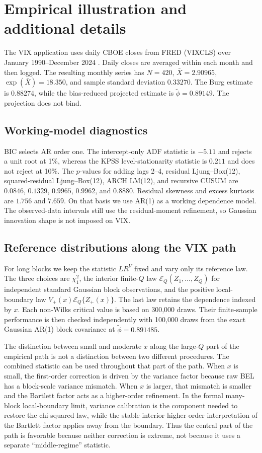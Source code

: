 \documentclass[12pt]{article}
\theoremstyle{remark}
\begin{document}
\section{Empirical illustration and additional details}
\label{supp:empirical}
The VIX application uses daily CBOE closes from FRED (VIXCLS) over January 1990--December 2024 \citep{FRED:VIXCLS}. Daily closes are averaged within each month and then logged. The resulting monthly series has $N=420$, $\bar X=2.90965$, $\exp(\bar X)=18.350$, and sample standard deviation $0.33270$. The Burg estimate is $0.88274$, while the bias-reduced projected estimate is $\widetilde\phi=0.89149$. The projection does not bind.

\subsection{Working-model diagnostics}
BIC selects AR order one. The intercept-only ADF statistic is $-5.11$ and rejects a unit root at 1\%, whereas the KPSS level-stationarity statistic is $0.211$ and does not reject at 10\%. The $p$-values for adding lags 2--4, residual Ljung--Box(12), squared-residual Ljung--Box(12), ARCH LM(12), and recursive CUSUM are $0.0846$, $0.1329$, $0.9965$, $0.9962$, and $0.8880$. Residual skewness and excess kurtosis are $1.756$ and $7.659$. On that basis we use AR(1) as a working dependence model. The observed-data intervals still use the residual-moment refinement, so Gaussian innovation shape is not imposed on VIX.

\subsection{Reference distributions along the VIX path}
For long blocks we keep the statistic $LR^V$ fixed and vary only its reference law. The three choices are $\chi_1^2$, the interior finite-$Q$ law $\mathcal E_Q(Z_1,\ldots,Z_Q)$ for independent standard Gaussian block observations, and the positive local-boundary law $V_+(x)\mathcal E_Q\{Z_+(x)\}$. The last law retains the dependence indexed by $x$. Each non-Wilks critical value is based on 300,000 draws. Their finite-sample performance is then checked independently with 100,000 draws from the exact Gaussian AR(1) block covariance at $\widetilde\phi=0.891485$.

The distinction between small and moderate $x$ along the large-$Q$ part of the empirical path is not a distinction between two different procedures. The combined statistic can be used throughout that part of the path. When $x$ is small, the first-order correction is driven by the variance factor because raw BEL has a block-scale variance mismatch. When $x$ is larger, that mismatch is smaller and the Bartlett factor acts as a higher-order refinement. In the formal many-block local-boundary limit, variance calibration is the component needed to restore the chi-squared law, while the stable-interior higher-order interpretation of the Bartlett factor applies away from the boundary. Thus the central part of the path is favorable because neither correction is extreme, not because it uses a separate ``middle-regime'' statistic.
\end{document}

